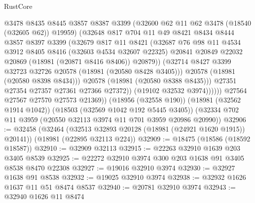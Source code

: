 \begin{lexlean}{RustCore}
\begin{coremodule}
                        @3478
                        @8435
                        @8445
                        @3857
                        @8387
                        @3399
                        (@32600 @62 @11 @62 @3478 (@18540 (@32605 @62)) @19959)
                        (@32648
                          @817
                          @704
                          @11
                          @49
                          @8421
                          @8434
                          @8444
                          @3857
                          @8397
                          @3399
                          (@32679
                            @817
                            @11
                            @8421
                            (@32687
                              @76
                              @98
                              @11
                              @4534
                              @3912
                              @8405
                              @8416
                              (@32603 @4534 @32607 @22325)
                              @20841
                              @20849
                              @22032
                              @20869
                              (@18981 (@20871 @8416 @8406))
                              @20879))
                          (@32714 @8427 @3399 @32723 @32726 @20578 (@18981 (@20580 @8428 @3405)))
                          @20578
                          (@18981 (@20580 @8398 @8434)))
                        @20578
                        (@18981 (@20580 @8388 @8435)))
                      @27351
                      @27354
                      @27357
                      @27361
                      @27366
                      @27372))
                  (@19102 @32532 @3974))))))
        @27564
        @27567
        @27570
        @27573
        @21369))
    (@18956 (@32558 @190))
    (@18981 (@32562 @1914 @1042))
    (@18503 (@32569 @1042 @192 @5445 @3405))
    (@32334 @702 @11 @3959 (@20550 @32113 @3974 @11 @701 @3959 @20986 @20990))
@32906 := @32458
    (@32464 (@32513 @32893 @20128 (@18981 (@24921 @1620 @1915)) @20141))
    (@18981 (@22895 @32113 @224))
@32909 := @18475 (@18586 (@18592 @18587))
@32910 := @32909 @32113
@32915 := @22263 @32910 @1639 @203 @3405 @8539
@32925 := @22272 @32910 @3974 @300 @203 @1638 @91 @3405 @8538 @8470 @22308
@32927 := @19016 @32910 @3974
@32930 := @32927 @1638 @91 @8538
@32932 := @19025 @32910 @3974
@32938 := @32932 @1626 @1637 @11 @51 @8474 @8537
@32940 := @20781 @32910 @3974
@32943 := @32940 @1626 @11 @8474

\end{coremodule}
\end{lexlean}
